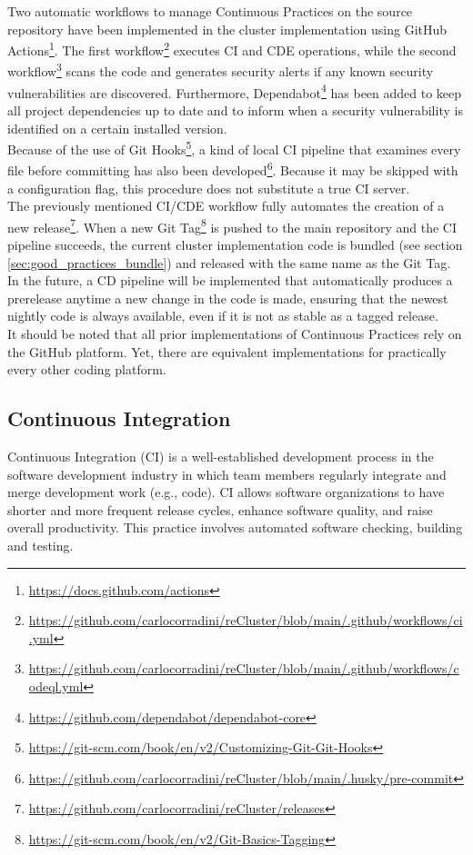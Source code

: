 Two automatic workflows to manage Continuous Practices on the source repository have
been implemented in the cluster implementation using GitHub Actions\footnote{\url{https://docs.github.com/actions}}.
The first workflow\footnote{\url{https://github.com/carlocorradini/reCluster/blob/main/.github/workflows/ci.yml}}
executes CI and CDE operations, while the second workflow\footnote{\url{https://github.com/carlocorradini/reCluster/blob/main/.github/workflows/codeql.yml}}
scans the code and generates security alerts if any known security vulnerabilities
are discovered. Furthermore, Dependabot\footnote{\url{https://github.com/dependabot/dependabot-core}}
has been added to keep all project dependencies up to date and to inform when a security
vulnerability is identified on a certain installed version. \\ %
Because of the use of Git Hooks\footnote{\url{https://git-scm.com/book/en/v2/Customizing-Git-Git-Hooks}},
a kind of local CI pipeline that examines every file before committing has also
been developed\footnote{\url{https://github.com/carlocorradini/reCluster/blob/main/.husky/pre-commit}}.
Because it may be skipped with a configuration flag, this procedure does not
substitute a true CI server. \\ %
The previously mentioned CI/CDE workflow fully automates the creation of a new
release\footnote{\url{https://github.com/carlocorradini/reCluster/releases}}. When
a new Git Tag\footnote{\url{https://git-scm.com/book/en/v2/Git-Basics-Tagging}} is
pushed to the main repository and the CI pipeline succeeds, the current cluster
implementation code is bundled (see section \ref{sec:good_practices_bundle}) and
released with the same name as the Git Tag. In the future, a CD pipeline will be
implemented that automatically produces a prerelease anytime a new change in the
code is made, ensuring that the newest nightly code is always available, even if
it is not as stable as a tagged release. \\ %
It should be noted that all prior implementations of Continuous Practices rely
on the GitHub platform. Yet, there are equivalent implementations for
practically every other coding platform.

\subsection{Continuous Integration}
\label{subsec:good_practices_continuous_practices_continuous_integration}

Continuous Integration (CI) is a well-established development process in the software
development industry in which team members regularly integrate and merge development
work (e.g., code). CI allows software organizations to have shorter and more
frequent release cycles, enhance software quality, and raise overall
productivity. This practice involves automated software checking, building and
testing\cite{continuous_practices}.

